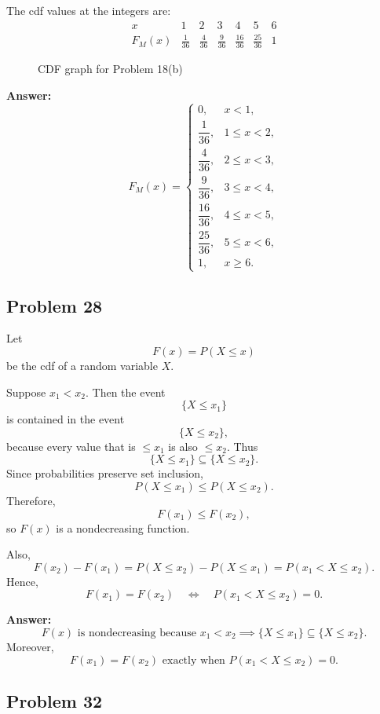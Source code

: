 \documentclass[11pt]{article}
\begin{document}
\begin{enumerate}
    The cdf values at the integers are:
    \[
    \begin{array}{c|cccccc}
    x & 1 & 2 & 3 & 4 & 5 & 6 \\ \hline
    F_M(x) & \frac{1}{36} & \frac{4}{36} & \frac{9}{36} & \frac{16}{36} & \frac{25}{36} & 1
    \end{array}
    \]

    \begin{figure}[ht]
    \centering
    \vspace{2in}
    \caption{CDF graph for Problem 18(b)}
    \end{figure}

    \textbf{Answer:}
    \[
    \boxed{
    F_M(x)=
    \begin{cases}
    0, & x<1,\\
    \dfrac{1}{36}, & 1\le x<2,\\
    \dfrac{4}{36}, & 2\le x<3,\\
    \dfrac{9}{36}, & 3\le x<4,\\
    \dfrac{16}{36}, & 4\le x<5,\\
    \dfrac{25}{36}, & 5\le x<6,\\
    1, & x\ge 6.
    \end{cases}}
    \]
\end{enumerate}

\subsection*{Problem 28}

Let
\[
F(x)=P(X\le x)
\]
be the cdf of a random variable \(X\).

Suppose \(x_1<x_2\). Then the event
\[
\{X\le x_1\}
\]
is contained in the event
\[
\{X\le x_2\},
\]
because every value that is \(\le x_1\) is also \(\le x_2\). Thus
\[
\{X\le x_1\}\subseteq \{X\le x_2\}.
\]
Since probabilities preserve set inclusion,
\[
P(X\le x_1)\le P(X\le x_2).
\]
Therefore,
\[
F(x_1)\le F(x_2),
\]
so \(F(x)\) is a nondecreasing function.

Also,
\[
F(x_2)-F(x_1)=P(X\le x_2)-P(X\le x_1)=P(x_1<X\le x_2).
\]
Hence,
\[
F(x_1)=F(x_2)
\quad \Longleftrightarrow \quad
P(x_1<X\le x_2)=0.
\]

\textbf{Answer:}
\[
\boxed{F(x)\text{ is nondecreasing because }x_1<x_2 \implies \{X\le x_1\}\subseteq \{X\le x_2\}.}
\]
Moreover,
\[
\boxed{F(x_1)=F(x_2)\text{ exactly when }P(x_1<X\le x_2)=0.}
\]

\subsection*{Problem 32}
\end{document}

